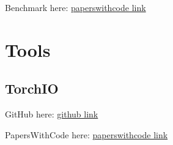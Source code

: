 Benchmark here: \href{https://paperswithcode.com/dataset/epilepsy-seizure-prediction}{paperswithcode link}

\section{Tools}

\subsection{TorchIO}

GitHub here: \href{https://github.com/TorchIO-project/torchio}{github link}

PapersWithCode here: \href{https://paperswithcode.com/paper/torchio-a-python-library-for-efficient}{paperswithcode link}

